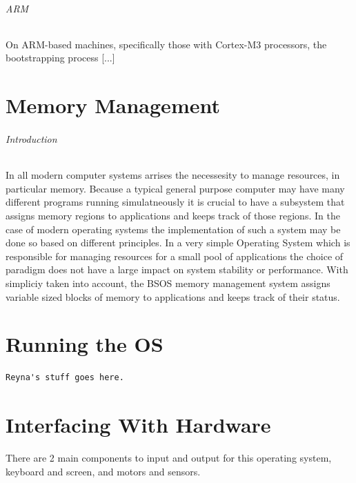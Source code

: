 \documentclass[english]{article}
\begin{document}
\paragraph{ARM}
On ARM-based machines, specifically those with Cortex-M3 processors, the bootstrapping process [...]


\part{Memory Management}

\paragraph{Introduction}
In all modern computer systems arrises the necessesity to manage resources, in particular memory. Because a typical general purpose computer
may have many different programs running simulatneously it is crucial to have a subsystem that assigns memory regions to applications and keeps
track of those regions. In the case of modern operating systems the implementation of such a system may be done so based on different principles.
In a very simple Operating System which is responsible for managing resources for a small pool of applications the choice of paradigm does not have a large impact on system stability or performance.
With simpliciy taken into account, the BSOS memory management system assigns variable sized blocks of memory to applications and keeps track of their status.



\part{Running the OS}

\begin{lstlisting}
Reyna's stuff goes here.
\end{lstlisting}



\part{Interfacing With Hardware}
There are 2 main components to input and output for this operating system, keyboard and screen, and motors and sensors.
\end{document}
